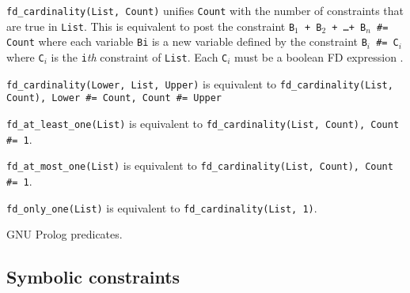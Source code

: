 \texttt{fd\_cardinality(List, Count)} unifies \texttt{Count} with the number
of constraints that are true in \texttt{List}. This is equivalent to post
the constraint \texttt{B$_{1}$ + B$_{2}$ + \ldots + B$_{n}$ \#= Count}
where each variable \texttt{Bi} is a new variable defined by the constraint
\texttt{B$_{i}$ \#{\lt}={\gt} C$_{i}$} where \texttt{C$_{i}$} is the
\texttt{i}\emph{th} constraint of \texttt{List}. Each \texttt{C$_{i}$}
must be a boolean FD expression .

\texttt{fd\_cardinality(Lower, List, Upper)} is equivalent to
\texttt{fd\_cardinality(List, Count), Lower \#={\lt} Count, Count \#={\lt}
Upper}

\texttt{fd\_at\_least\_one(List)} is equivalent to
\texttt{fd\_cardinality(List, Count), Count \#{\gt}= 1}.

\texttt{fd\_at\_most\_one(List)} is equivalent to
\texttt{fd\_cardinality(List, Count), Count \#={\lt} 1}.

\texttt{fd\_only\_one(List)} is equivalent to \texttt{fd\_cardinality(List,
1)}.

\begin{PlErrors}









\end{PlErrors}

\Portability

GNU Prolog predicates.

\subsection{Symbolic constraints}

